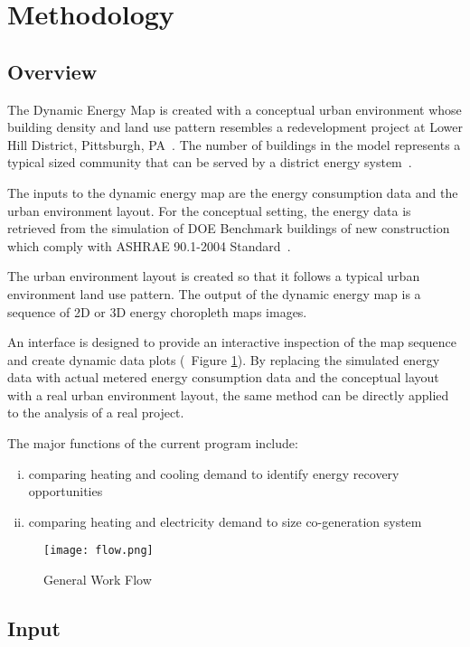 \documentclass[hidelinks,12pt]{article}
\newcommand{\fref}[1]{Figure \ref{#1}}
\begin{document}
\pagebreak
\section{Methodology}\label{method}
\subsection{Overview}
The Dynamic Energy Map is created with a conceptual urban environment
whose building density and land use pattern resembles a redevelopment
project at Lower Hill District, Pittsburgh, PA~\cite{Ramesh2013}. The
number of buildings in the model represents a typical sized community
that can be served by a district energy system~\cite{IDEA2012}.

The inputs to the dynamic energy map are the energy consumption data
and the urban environment layout. For the conceptual setting, the
energy data is retrieved from the simulation of DOE Benchmark
buildings of new construction which comply with ASHRAE 90.1-2004
Standard~\cite{DOE2015}.

The urban environment layout is created so that it follows a typical
urban environment land use pattern. The output of the dynamic energy
map is a sequence of 2D or 3D energy choropleth maps images. 

An interface is designed to provide an interactive inspection of the
map sequence and create dynamic data plots (~\fref{fig:flow}). By
replacing the simulated energy data with actual metered energy
consumption data and the conceptual layout with a real urban
environment layout, the same method can be directly applied to the
analysis of a real project.

The major functions of the current program include: 
\begin{enumerate}[i.]
\item  comparing heating and cooling demand to identify energy recovery opportunities 
\item comparing heating and electricity demand to size co-generation system
\end{enumerate}

\begin{figure}[htbp]
  \centering
  \texttt{[image: flow.png]}
  \caption{General Work Flow}
  \label{fig:flow}
\end{figure}

\newpage
\subsection{Input}
\end{document}
